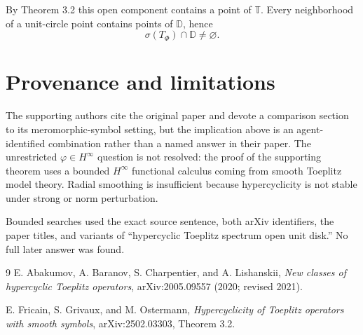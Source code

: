 \documentclass[11pt]{article}
\begin{document}
By Theorem 3.2 this open component contains a point of $\mathbb T$.  Every
neighborhood of a unit-circle point contains points of $\mathbb D$, hence
\[
 \sigma(T_\Phi)\cap\mathbb D\ne\varnothing.
\]

\section*{Provenance and limitations}

The supporting authors cite the original paper and devote a comparison
section to its meromorphic-symbol setting, but the implication above is an
agent-identified combination rather than a named answer in their paper.
The unrestricted $\varphi\in H^\infty$ question is not resolved: the proof of
the supporting theorem uses a bounded $H^\infty$ functional calculus coming
from smooth Toeplitz model theory.  Radial smoothing is insufficient because
hypercyclicity is not stable under strong or norm perturbation.

Bounded searches used the exact source sentence, both arXiv identifiers,
the paper titles, and variants of ``hypercyclic Toeplitz spectrum open unit
disk.''  No full later answer was found.

\begin{thebibliography}{9}
E. Abakumov, A. Baranov, S. Charpentier, and A. Lishanskii,
\emph{New classes of hypercyclic Toeplitz operators},
arXiv:2005.09557 (2020; revised 2021).

E. Fricain, S. Grivaux, and M. Ostermann,
\emph{Hypercyclicity of Toeplitz operators with smooth symbols},
arXiv:2502.03303, Theorem 3.2.
\end{thebibliography}
\end{document}
